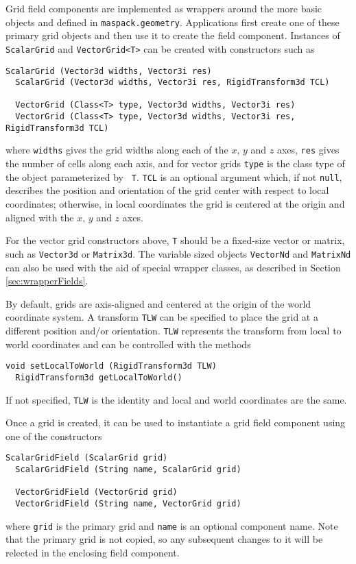 Grid field components are implemented as wrappers around the more
basic objects  and
 defined in
{\tt maspack.geometry}. Applications first create one of these primary
grid objects and then use it to create the field component.  Instances
of {\tt ScalarGrid} and {\tt VectorGrid<T>} can be created with
constructors such as
%
\begin{lstlisting}[]
  ScalarGrid (Vector3d widths, Vector3i res)
  ScalarGrid (Vector3d widths, Vector3i res, RigidTransform3d TCL)

  VectorGrid (Class<T> type, Vector3d widths, Vector3i res)
  VectorGrid (Class<T> type, Vector3d widths, Vector3i res, RigidTransform3d TCL)
\end{lstlisting}
%
where {\tt widths} gives the grid widths along each of the $x$, $y$
and $z$ axes, {\tt res} gives the number of cells along each axis, and
for vector grids {\tt type} is the class type of the
 object parameterized by {\tt
T}.  {\tt TCL} is an optional argument which, if not {\tt null},
describes the position and orientation of the grid center with respect
to local coordinates; otherwise, in local coordinates the grid is
centered at the origin and aligned with the $x$, $y$ and $z$ axes.

\begin{sideblock}
For the vector grid constructors above, {\tt T} should be a fixed-size
vector or matrix, such as {\tt Vector3d} or {\tt Matrix3d}.  The
variable sized objects {\tt VectorNd} and {\tt MatrixNd} can also be
used with the aid of special wrapper classes, as described in Section
\ref{sec:wrapperFields}.
\end{sideblock}

By default, grids are axis-aligned and centered at the origin of the
world coordinate system. A transform {\tt TLW} can be specified to
place the grid at a different position and/or orientation.  {\tt TLW}
represents the transform from local to world coordinates and can be
controlled with the methods
%
\begin{lstlisting}[]
  void setLocalToWorld (RigidTransform3d TLW)
  RigidTransform3d getLocalToWorld()
\end{lstlisting}
%
If not specified, {\tt TLW} is the identity and local and world
coordinates are the same.

Once a grid is created, it can be used to instantiate a grid field
component using one of the constructors
%
\begin{lstlisting}[]
  ScalarGridField (ScalarGrid grid)
  ScalarGridField (String name, ScalarGrid grid)

  VectorGridField (VectorGrid grid)
  VectorGridField (String name, VectorGrid grid)
\end{lstlisting}
%
where {\tt grid} is the primary grid and {\tt name} is an optional
component name. Note that the primary grid is not copied, so any
subsequent changes to it will be relected in the enclosing field
component.

